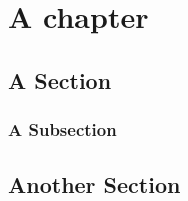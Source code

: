 \chapter{A chapter}



\section{A Section}



\subsection{A Subsection}



\section{Another Section}

